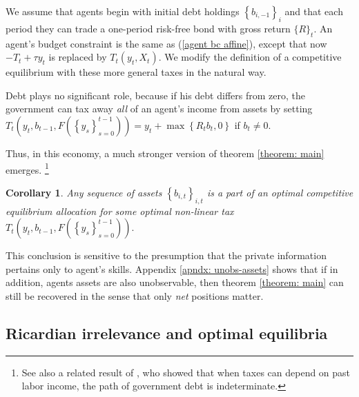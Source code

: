 \documentclass[thmsb,11pt]{article}
\newtheorem{corollary}{Corollary}
\begin{document}
We assume that agents begin with initial debt
holdings $\left \{ b_{i,-1}\right \} _{i}$ and that each period they can
 trade a one-period risk-free bond with gross return $\{R\}_t$. An
agent's budget constraint is the same as (\ref{agent bc affine}),  except that now
$-T_{t}+\tau y_{t}$ is replaced by $T_{t}\left( y_{t},X_{t}\right) .$ We
modify the definition of a competitive equilibrium with these more general
taxes in the natural way.

Debt plays no significant role, because  if his debt differs from zero, the government
can tax away \textit{all} of an agent's income
from assets by setting $T_{t}\left( y_{t},b_{t-1},F\left( \left \{
y_{s}\right \} _{s=0}^{t-1}\right) \right) =y_{t}+\max \left \{
R_{t}b_{t},0\right \} $ if $b_{t}\neq 0.$

Thus,  in this economy,  a much stronger version of theorem \ref{theorem: main} emerges.%
\footnote{%
See also a related result of \citet{Bassetto2004}, who showed
that when taxes can depend on past labor income, the path of government debt
is indeterminate.}

\begin{corollary}
Any sequence of assets $\left \{ b_{i,t}\right \} _{i,t}$ is a part of an
optimal competitive equilibrium allocation for some optimal non-linear tax $%
T_{t}\left( y_{t},b_{t-1},F\left( \left \{ y_{s}\right \}
_{s=0}^{t-1}\right) \right) .$
\end{corollary}
This conclusion is sensitive to the presumption that the private information pertains only  to agent's skills. Appendix \ref{apndx: unobs-assets} shows that if in addition, agents assets are also unobservable, then theorem \ref{theorem: main} can still be recovered in the sense that only \emph{net} positions matter.

\subsection{Ricardian irrelevance and optimal equilibria}
\end{document}
